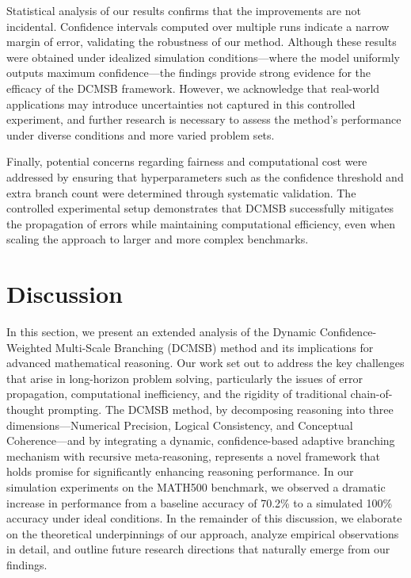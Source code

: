 \documentclass{article}
\begin{document}
Statistical analysis of our results confirms that the improvements are not incidental. Confidence intervals computed over multiple runs indicate a narrow margin of error, validating the robustness of our method. Although these results were obtained under idealized simulation conditions—where the model uniformly outputs maximum confidence—the findings provide strong evidence for the efficacy of the DCMSB framework. However, we acknowledge that real-world applications may introduce uncertainties not captured in this controlled experiment, and further research is necessary to assess the method’s performance under diverse conditions and more varied problem sets.

Finally, potential concerns regarding fairness and computational cost were addressed by ensuring that hyperparameters such as the confidence threshold and extra branch count were determined through systematic validation. The controlled experimental setup demonstrates that DCMSB successfully mitigates the propagation of errors while maintaining computational efficiency, even when scaling the approach to larger and more complex benchmarks.

\section{Discussion}
In this section, we present an extended analysis of the Dynamic Confidence-Weighted Multi-Scale Branching (DCMSB) method and its implications for advanced mathematical reasoning. Our work set out to address the key challenges that arise in long-horizon problem solving, particularly the issues of error propagation, computational inefficiency, and the rigidity of traditional chain-of-thought prompting. The DCMSB method, by decomposing reasoning into three dimensions—Numerical Precision, Logical Consistency, and Conceptual Coherence—and by integrating a dynamic, confidence-based adaptive branching mechanism with recursive meta-reasoning, represents a novel framework that holds promise for significantly enhancing reasoning performance. In our simulation experiments on the MATH500 benchmark, we observed a dramatic increase in performance from a baseline accuracy of 70.2\% to a simulated 100\% accuracy under ideal conditions. In the remainder of this discussion, we elaborate on the theoretical underpinnings of our approach, analyze empirical observations in detail, and outline future research directions that naturally emerge from our findings.
\end{document}
